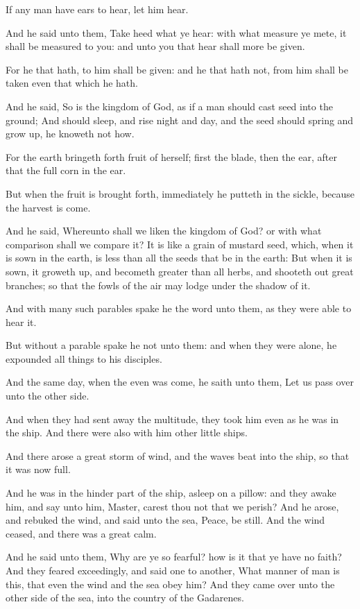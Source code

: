 \Verse If any man have ears to hear, let him hear.

\Verse And he said unto them, Take heed what ye hear: with what measure ye mete, it shall be measured to you: and unto you that hear shall more be given.

\Verse For he that hath, to him shall be given: and he that hath not, from him shall be taken even that which he hath.

\Verse And he said, So is the kingdom of God, as if a man should cast seed into the ground; \Verse And should sleep, and rise night and day, and the seed should spring and grow up, he knoweth not how.

\Verse For the earth bringeth forth fruit of herself; first the blade, then the ear, after that the full corn in the ear.

\Verse But when the fruit is brought forth, immediately he putteth in the sickle, because the harvest is come.

\Verse And he said, Whereunto shall we liken the kingdom of God? or with what comparison shall we compare it?  \Verse It is like a grain of mustard seed, which, when it is sown in the earth, is less than all the seeds that be in the earth: \Verse But when it is sown, it groweth up, and becometh greater than all herbs, and shooteth out great branches; so that the fowls of the air may lodge under the shadow of it.

\Verse And with many such parables spake he the word unto them, as they were able to hear it.

\Verse But without a parable spake he not unto them: and when they were alone, he expounded all things to his disciples.

\Verse And the same day, when the even was come, he saith unto them, Let us pass over unto the other side.

\Verse And when they had sent away the multitude, they took him even as he was in the ship. And there were also with him other little ships.

\Verse And there arose a great storm of wind, and the waves beat into the ship, so that it was now full.

\Verse And he was in the hinder part of the ship, asleep on a pillow: and they awake him, and say unto him, Master, carest thou not that we perish?  \Verse And he arose, and rebuked the wind, and said unto the sea, Peace, be still. And the wind ceased, and there was a great calm.

\Verse And he said unto them, Why are ye so fearful? how is it that ye have no faith?  \Verse And they feared exceedingly, and said one to another, What manner of man is this, that even the wind and the sea obey him?  
\Chapter
\Verse And they came over unto the other side of the sea, into the country of the Gadarenes.

